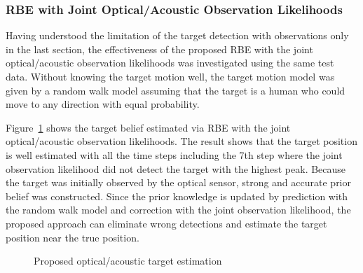 \subsubsection{RBE with Joint Optical/Acoustic Observation Likelihoods}
Having understood the limitation of the target detection with observations only in the last section, the effectiveness of the proposed RBE with the joint optical/acoustic observation likelihoods was investigated using the same test data.  Without knowing the target motion well, the target motion model was given by a random walk model assuming that the target is a human who could move to any direction with equal probability.  

Figure~\ref{fig:hybrid experiment} shows the target belief estimated via RBE with the joint optical/acoustic observation likelihoods.  The result shows that the target position is well estimated with all the time steps including the 7th step where the joint observation likelihood did not detect the target with the highest peak.  Because the target was initially observed by the optical sensor, strong and accurate prior belief was constructed.  Since the prior knowledge is updated by prediction with the random walk model and correction with the joint observation likelihood, the proposed approach can eliminate wrong detections and estimate the target position near the true position.  

\begin{figure}[ht]
	\centering
	\caption{Proposed optical/acoustic target estimation}
	\label{fig:hybrid experiment}
\end{figure}

